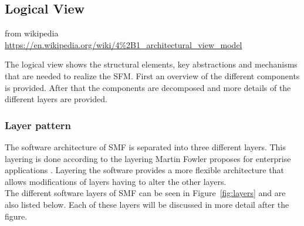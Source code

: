 \subsection{Logical View}
\label{subsec:logicalview}

{from wikipedia\\\url{https://en.wikipedia.org/wiki/4\%2B1_architectural_view_model}}

The logical view shows the structural elements, key abstractions and mechanisms that are needed to realize the SFM. First an overview of the different components is provided. After that the components are decomposed and more details of the different layers are provided.




%	

\subsubsection*{Layer pattern}
The software architecture of SMF is separated into three different layers. This layering is done according to the layering Martin Fowler proposes for enterprise applications \cite{Fowler:2002:PEA:579257,Fowler:web:servicelayer}.
Layering the software provides a more flexible architecture that allows modifications of layers having to alter the other layers.\\
The different software layers of SMF can be seen in Figure~\ref{fig:layers} and are also listed below. Each of these layers will be discussed in more detail after the figure.


